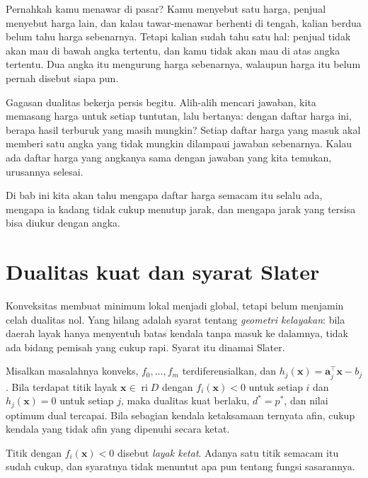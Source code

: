 \begin{untukanak}
Pernahkah kamu menawar di pasar? Kamu menyebut satu harga, penjual menyebut harga lain,
dan kalau tawar-menawar berhenti di tengah, kalian berdua belum tahu harga sebenarnya.
Tetapi kalian sudah tahu satu hal: penjual tidak akan mau di bawah angka tertentu, dan
kamu tidak akan mau di atas angka tertentu. Dua angka itu mengurung harga sebenarnya,
walaupun harga itu belum pernah disebut siapa pun.

Gagasan dualitas bekerja persis begitu. Alih-alih mencari jawaban, kita memasang harga
untuk setiap tuntutan, lalu bertanya: dengan daftar harga ini, berapa hasil terburuk yang
masih mungkin? Setiap daftar harga yang masuk akal memberi satu angka yang tidak mungkin
dilampaui jawaban sebenarnya. Kalau ada daftar harga yang angkanya sama dengan jawaban
yang kita temukan, urusannya selesai.

Di bab ini kita akan tahu mengapa daftar harga semacam itu selalu ada, mengapa ia kadang
tidak cukup menutup jarak, dan mengapa jarak yang tersisa bisa diukur dengan angka.
\end{untukanak}

\section{Dualitas kuat dan syarat Slater}

Konveksitas membuat minimum lokal menjadi global, tetapi belum menjamin celah dualitas
nol. Yang hilang adalah syarat tentang \emph{geometri kelayakan}: bila daerah layak hanya
menyentuh batas kendala tanpa masuk ke dalamnya, tidak ada bidang pemisah yang cukup rapi.
Syarat itu dinamai Slater.

\begin{teorema}
Misalkan masalahnya konveks, $f_{0},\dots,f_{m}$ terdiferensialkan, dan
$h_{j}(\mathbf{x})=\mathbf{a}_{j}^{\top}\mathbf{x}-b_{j}$. Bila terdapat titik layak
$\mathbf{x}\in\operatorname{ri}D$ dengan $f_{i}(\mathbf{x})<0$ untuk setiap $i$ dan
$h_{j}(\mathbf{x})=0$ untuk setiap $j$, maka dualitas kuat berlaku, $d^{*}=p^{*}$, dan
nilai optimum dual tercapai. Bila sebagian kendala ketaksamaan ternyata afin, cukup
kendala yang tidak afin yang dipenuhi secara ketat.
\end{teorema}

Titik dengan $f_{i}(\mathbf{x})<0$ disebut \emph{layak ketat}. Adanya satu titik semacam
itu sudah cukup, dan syaratnya tidak menuntut apa pun tentang fungsi sasarannya.

